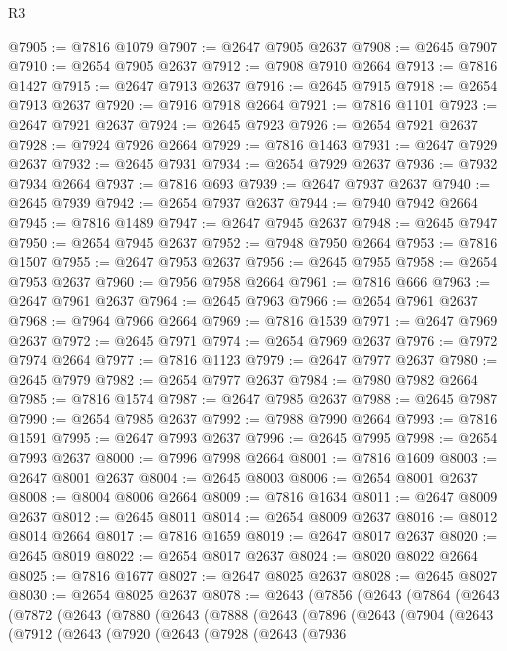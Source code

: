 \begin{lexlean}{R3}
\begin{coremodule}
@7905 := @7816 @1079
@7907 := @2647 @7905 @2637
@7908 := @2645 @7907
@7910 := @2654 @7905 @2637
@7912 := @7908 @7910 @2664
@7913 := @7816 @1427
@7915 := @2647 @7913 @2637
@7916 := @2645 @7915
@7918 := @2654 @7913 @2637
@7920 := @7916 @7918 @2664
@7921 := @7816 @1101
@7923 := @2647 @7921 @2637
@7924 := @2645 @7923
@7926 := @2654 @7921 @2637
@7928 := @7924 @7926 @2664
@7929 := @7816 @1463
@7931 := @2647 @7929 @2637
@7932 := @2645 @7931
@7934 := @2654 @7929 @2637
@7936 := @7932 @7934 @2664
@7937 := @7816 @693
@7939 := @2647 @7937 @2637
@7940 := @2645 @7939
@7942 := @2654 @7937 @2637
@7944 := @7940 @7942 @2664
@7945 := @7816 @1489
@7947 := @2647 @7945 @2637
@7948 := @2645 @7947
@7950 := @2654 @7945 @2637
@7952 := @7948 @7950 @2664
@7953 := @7816 @1507
@7955 := @2647 @7953 @2637
@7956 := @2645 @7955
@7958 := @2654 @7953 @2637
@7960 := @7956 @7958 @2664
@7961 := @7816 @666
@7963 := @2647 @7961 @2637
@7964 := @2645 @7963
@7966 := @2654 @7961 @2637
@7968 := @7964 @7966 @2664
@7969 := @7816 @1539
@7971 := @2647 @7969 @2637
@7972 := @2645 @7971
@7974 := @2654 @7969 @2637
@7976 := @7972 @7974 @2664
@7977 := @7816 @1123
@7979 := @2647 @7977 @2637
@7980 := @2645 @7979
@7982 := @2654 @7977 @2637
@7984 := @7980 @7982 @2664
@7985 := @7816 @1574
@7987 := @2647 @7985 @2637
@7988 := @2645 @7987
@7990 := @2654 @7985 @2637
@7992 := @7988 @7990 @2664
@7993 := @7816 @1591
@7995 := @2647 @7993 @2637
@7996 := @2645 @7995
@7998 := @2654 @7993 @2637
@8000 := @7996 @7998 @2664
@8001 := @7816 @1609
@8003 := @2647 @8001 @2637
@8004 := @2645 @8003
@8006 := @2654 @8001 @2637
@8008 := @8004 @8006 @2664
@8009 := @7816 @1634
@8011 := @2647 @8009 @2637
@8012 := @2645 @8011
@8014 := @2654 @8009 @2637
@8016 := @8012 @8014 @2664
@8017 := @7816 @1659
@8019 := @2647 @8017 @2637
@8020 := @2645 @8019
@8022 := @2654 @8017 @2637
@8024 := @8020 @8022 @2664
@8025 := @7816 @1677
@8027 := @2647 @8025 @2637
@8028 := @2645 @8027
@8030 := @2654 @8025 @2637
@8078 := @2643
    (@7856
      (@2643
        (@7864
          (@2643
            (@7872
              (@2643
                (@7880
                  (@2643
                    (@7888
                      (@2643
                        (@7896
                          (@2643
                            (@7904
                              (@2643
                                (@7912
                                  (@2643
                                    (@7920
                                      (@2643
                                        (@7928
                                          (@2643
                                            (@7936

\end{coremodule}
\end{lexlean}
